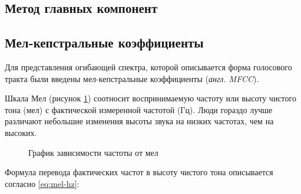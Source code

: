 
\subsection{Метод главных компонент}
\subsection{Мел-кепстральные коэффициенты}
Для представления огибающей спектра, которой описывается форма голосового тракта были введены мел-кепстральные коэффициенты (\textit{англ. MFCC}). \cite{mfcc}

Шкала Мел (рисунок \ref{fig:mel-hz}) соотносит воспринимаемую частоту или высоту чистого тона (мел) с фактической измеренной частотой (Гц). Люди гораздо лучше различают небольшие изменения высоты звука на низких частотах, чем на высоких. \cite{mel} 
\begin{figure}[H]
	\centering
	\caption{График зависимости частоты от мел}
	\label{fig:mel-hz}
\end{figure}
Формула перевода фактических частот в высоту чистого тона описывается согласно \ref{eq:mel-hz}:

